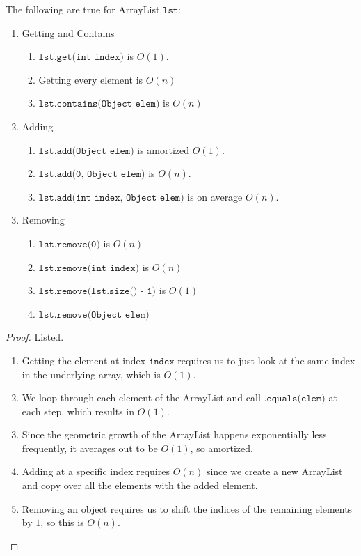   \begin{theorem}
  The following are true for ArrayList $\texttt{lst}$:  
  \begin{enumerate}
      \item Getting and Contains 
      \begin{enumerate}
          \item $\texttt{lst.get(int index)}$ is $O(1)$. 
          \item Getting every element is $O(n)$ 
          \item $\texttt{lst.contains(Object elem)}$ is $O(n)$
      \end{enumerate}
      
      \item Adding 
      \begin{enumerate}
          \item $\texttt{lst.add(Object elem)}$ is amortized $O(1)$. 
          \item $\texttt{lst.add(0, Object elem)}$ is $O(n)$. 
          \item $\texttt{lst.add(int index, Object elem)}$ is on average $O(n)$. 
      \end{enumerate}
      
      \item Removing 
      \begin{enumerate}
          \item $\texttt{lst.remove(0)}$ is $O(n)$ 
          \item $\texttt{lst.remove(int index)}$ is $O(n)$ 
          \item $\texttt{lst.remove(lst.size() - 1)}$ is $O(1)$ 
          \item $\texttt{lst.remove(Object elem)}$ 
      \end{enumerate}
  \end{enumerate}
  \end{theorem}
  \begin{proof}
  Listed. 
  \begin{enumerate}
      \item Getting the element at index $\texttt{index}$ requires us to just look at the same index in the underlying array, which is $O(1)$. 
      \item We loop through each element of the ArrayList and call $\texttt{.equals(elem)}$ at each step, which results in $O(1)$. 
      \item Since the geometric growth of the ArrayList happens exponentially less frequently, it averages out to be $O(1)$, so amortized. 
      \item Adding at a specific index requires $O(n)$ since we create a new ArrayList and copy over all the elements with the added element.  
      \item Removing an object requires us to shift the indices of the remaining elements by $1$, so this is $O(n)$. 
  \end{enumerate}
  \end{proof}

